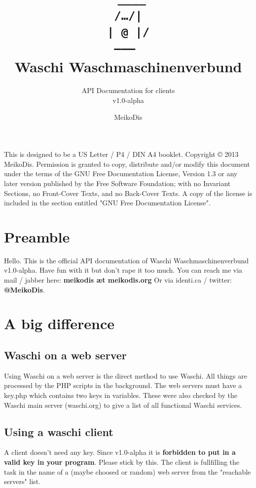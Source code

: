 \documentclass[letterpaper,twoside]{scrartcl}
\title{ 
 \texttt{
  \_\_\_\_ \\
  /…/|\\
  | @ |/\\
  \hspace{-8mm}
  --------
 } \\Waschi Waschmaschinenverbund}
\subtitle{API Documentation for clients \\ v1.0-alpha}
\author{MeikoDis}
\begin{document}
 \maketitle
 \thispagestyle{empty}


 \newpage
 \vspace*{\fill}
 This is designed to be a US Letter / P4 / DIN A4 booklet.
 \null
 \vfill
 Copyright ©  2013   MeikoDis.\newline\newline
 Permission is granted to copy, distribute and/or modify this document
 under the terms of the GNU Free Documentation License, Version 1.3
 or any later version published by the Free Software Foundation;
 with no Invariant Sections, no Front-Cover Texts, and no Back-Cover Texts.
 A copy of the license is included in the section entitled "GNU
 Free Documentation License".



 \newpage
 \tableofcontents


 \newpage
 \section{Preamble}

  Hello. This is the official API documentation of Waschi Waschmaschinenverbund v1.0-alpha. Have fun with it but don't rape it too much.
  \newline
  You can reach me via mail / jabber here: \textbf{meikodis æt meikodis.org}
  \newline
  Or via identi.ca / twitter: \textbf{@MeikoDis}.
  \newline


 \section{A big difference}

  \subsection{Waschi on a web server}
   Using Waschi on a web server is the direct method to use Waschi. 
   All things are processed by the PHP scripts in the background. 
   The web servers must have a key.php which contains two keys in variables.
   These were also checked by the Waschi main server (waschi.org) to give a list of all functional Waschi services.

  \subsection{Using a waschi client}
   A client doesn't need any key. Since v1.0-alpha it is \textbf{forbidden to put in a valid key in your program}. Please stick by this. 
   The client is fullfilling the task in the name of a (maybe choosed or random) web server from the "reachable servers" list.
   \newline
\end{document}
